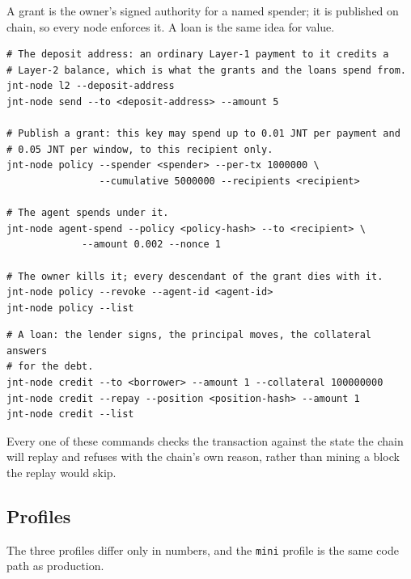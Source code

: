 \documentclass{article}
\begin{document}
A grant is the owner's signed authority for a named spender; it is published on
chain, so every node enforces it. A loan is the same idea for value.

\begin{verbatim}
# The deposit address: an ordinary Layer-1 payment to it credits a
# Layer-2 balance, which is what the grants and the loans spend from.
jnt-node l2 --deposit-address
jnt-node send --to <deposit-address> --amount 5

# Publish a grant: this key may spend up to 0.01 JNT per payment and
# 0.05 JNT per window, to this recipient only.
jnt-node policy --spender <spender> --per-tx 1000000 \
                --cumulative 5000000 --recipients <recipient>

# The agent spends under it.
jnt-node agent-spend --policy <policy-hash> --to <recipient> \
             --amount 0.002 --nonce 1

# The owner kills it; every descendant of the grant dies with it.
jnt-node policy --revoke --agent-id <agent-id>
jnt-node policy --list
\end{verbatim}

\begin{verbatim}
# A loan: the lender signs, the principal moves, the collateral answers
# for the debt.
jnt-node credit --to <borrower> --amount 1 --collateral 100000000
jnt-node credit --repay --position <position-hash> --amount 1
jnt-node credit --list
\end{verbatim}

Every one of these commands checks the transaction against the state the chain
will replay and refuses with the chain's own reason, rather than mining a block
the replay would skip.

\subsection{Profiles}

The three profiles differ only in numbers, and the \texttt{mini} profile is
the same code path as production.
\end{document}
